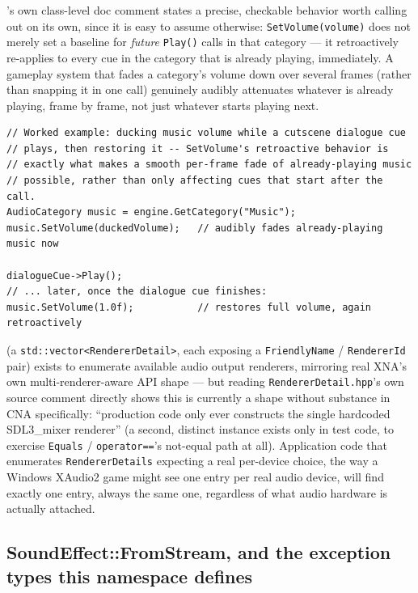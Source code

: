 's own class-level doc comment states a precise, checkable behavior
worth calling out on its own, since it is easy to assume otherwise: \texttt{SetVolume(volume)}
does not merely set a baseline for \emph{future} \texttt{Play()} calls in that category --- it
retroactively re-applies to every cue in the category that is already playing, immediately.
A gameplay system that fades a category's volume down over several frames (rather than
snapping it in one call) genuinely audibly attenuates whatever is already playing, frame by
frame, not just whatever starts playing next.

\begin{lstlisting}
// Worked example: ducking music volume while a cutscene dialogue cue
// plays, then restoring it -- SetVolume's retroactive behavior is
// exactly what makes a smooth per-frame fade of already-playing music
// possible, rather than only affecting cues that start after the call.
AudioCategory music = engine.GetCategory("Music");
music.SetVolume(duckedVolume);   // audibly fades already-playing music now

dialogueCue->Play();
// ... later, once the dialogue cue finishes:
music.SetVolume(1.0f);           // restores full volume, again retroactively
\end{lstlisting}

 (a \texttt{std::vector<RendererDetail>}, each exposing
a \texttt{FriendlyName} / \texttt{RendererId} pair) exists to enumerate available audio output
renderers, mirroring real XNA's own multi-renderer-aware API shape --- but reading
\texttt{RendererDetail.hpp}'s own source comment directly shows this is currently a shape
without substance in CNA specifically: ``production code only ever constructs the single
hardcoded SDL3\_mixer renderer'' (a second, distinct instance exists only in test code, to
exercise \texttt{Equals} / \texttt{operator==}'s not-equal path at all). Application code that
enumerates \texttt{RendererDetails} expecting a real per-device choice, the way a Windows XAudio2
game might see one entry per real audio device, will find exactly one entry, always the same
one, regardless of what audio hardware is actually attached.

\subsection{SoundEffect::FromStream, and the exception types this namespace defines}


